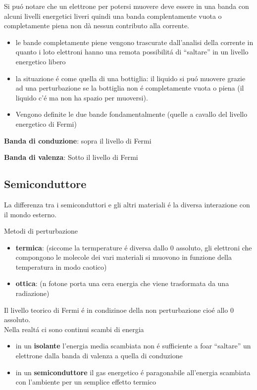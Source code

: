 \documentclass{article}
\begin{document}
Si pu\'o notare che un elettrone per potersi muovere deve essere in una banda con alcuni livelli energetici liveri quindi una banda complentamente vuota o completamente piena non d\`a nessun contributo alla corrente.
\begin{itemize}
    \item le bande completamente piene vengono trascurate dall'analisi della corrente in quanto i loto elettroni hanno una remota possibilit\'a di ``saltare'' in un livello energetico libero
    \item la situazione \'e come quella di una bottiglia: il liquido si pu\'o muovere grazie ad una perturbazione se la bottiglia non \'e completamente vuota o piena (il liquido c'\'e ma non ha spazio per muoversi).
    \item Vengono definite le due bande fondamentalmente (quelle a cavallo del livello energetico di Fermi)
\end{itemize}

\textbf{Banda di conduzione}: sopra il livello di Fermi


\textbf{Banda di valenza}: Sotto il livello di Fermi


\subsection{Semiconduttore}
La differenza tra i semiconduttori e gli altri materiali \'e la diversa interazione con il mondo esterno.

Metodi  di perturbazione
\begin{itemize}
    \item \textbf{termica}: (siccome la termperature \'e diversa dallo 0 assoluto, gli elettroni che compongono le molecole dei vari materiali si muovono in funzione della temperatura in modo caotico)
    \item \textbf{ottica}: (n fotone porta una cera energia che viene trasformata da una radiazione)
\end{itemize}

Il livello teorico di Fermi \'e in condizinoe della non perturbazione cio\'e allo 0 assoluto.\\
Nella realt\'a ci sono continui scambi di energia

\begin{itemize}
    \item in un \textbf{isolante} l'energia media scambiata non \'e sufficiente a foar ``saltare'' un elettrone dalla banda di valenza a quella di conduzione
    \item in un \textbf{semiconduttore} il gas energetico \'e paragonabile all'energia scambiata con l'ambiente per un semplice effetto termico
\end{itemize}
\end{document}
